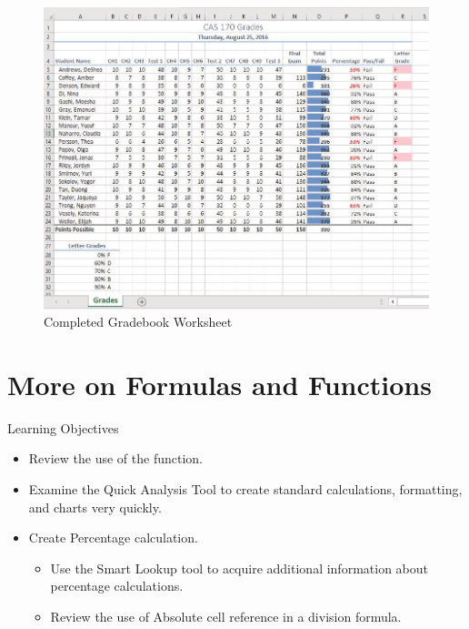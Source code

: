 \begin{figure}[H]
	\centering
	\includegraphics[width=\maxwidth{.95\linewidth}]{gfx/ch03_fig01}
	\caption{Completed Gradebook Worksheet}
	\label{03:fig01}
\end{figure}

\section{More on Formulas and Functions}

\begin{center}
	\begin{objbox}{Learning Objectives}
		\begin{itemize}
			\setlength{\itemsep}{0pt}
			\setlength{\parskip}{0pt}
			\setlength{\parsep}{0pt}
			
			\item Review the use of the  function.
			\item Examine the Quick Analysis Tool to create standard calculations, formatting, and charts very quickly.
			\item Create Percentage calculation.

			\begin{itemize}
				\setlength{\itemsep}{0pt}
				\setlength{\parskip}{0pt}
				\setlength{\parsep}{0pt}

				\item Use the Smart Lookup tool to acquire additional information about percentage calculations.
				\item Review the use of Absolute cell reference in a division formula.
			\end{itemize}

		\end{itemize}
	\end{objbox}
\end{center}

